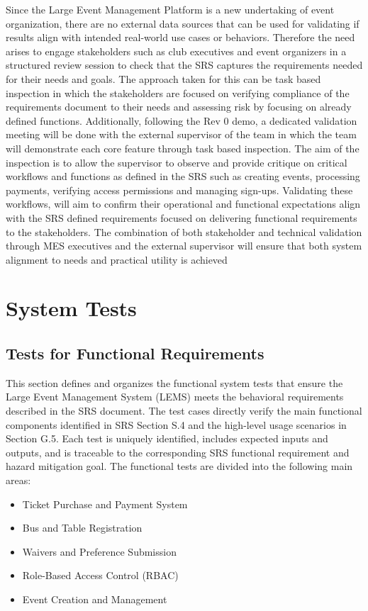 \documentclass[12pt, titlepage]{article}
\begin{document}
Since the Large Event Management Platform is a new undertaking of event organization, there are no external data sources that can be used for validating if results align with intended real-world use cases or behaviors. Therefore the need arises to engage stakeholders such as club executives and event organizers in a structured review session to check that the SRS captures the requirements needed for their needs and goals. The approach taken for this can be task based inspection in which the stakeholders are focused on verifying compliance of the requirements document to their needs and assessing risk by focusing on already defined functions. Additionally, following the Rev 0 demo, a dedicated validation meeting will be done with the external supervisor of the team in which the team will demonstrate each core feature through task based inspection. The aim of the inspection is to allow the supervisor to observe and provide critique on critical workflows and functions as defined in the SRS such as creating events, processing payments, verifying access permissions and managing sign-ups. Validating these workflows, will aim to confirm their operational and functional expectations align with the SRS defined requirements focused on delivering functional requirements to the stakeholders. The combination of both stakeholder and technical validation through MES executives and the external supervisor will ensure that both system alignment to needs and practical utility is achieved


\section{System Tests}

\subsection{Tests for Functional Requirements}

This section defines and organizes the functional system tests that ensure the Large Event Management System (LEMS) meets the behavioral requirements described in the SRS document. The test cases directly verify the main functional components identified in SRS Section S.4 and the high-level usage scenarios in Section G.5.  
Each test is uniquely identified, includes expected inputs and outputs, and is traceable to the corresponding SRS functional requirement and hazard mitigation goal.\newline \newline
The functional tests are divided into the following main areas:
\begin{itemize}
    \item Ticket Purchase and Payment System
    \item Bus and Table Registration
    \item Waivers and Preference Submission
    \item Role-Based Access Control (RBAC)
    \item Event Creation and Management
\end{itemize}
\end{document}
